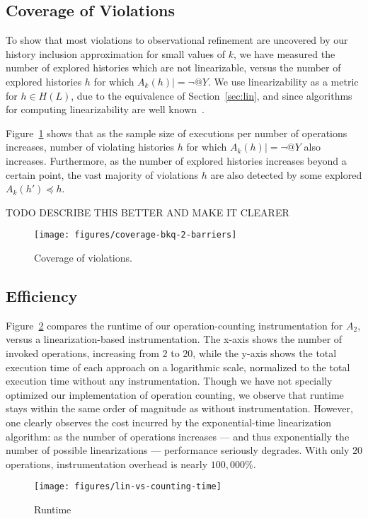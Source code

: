 \subsection{Coverage of Violations}

To show that most violations to observational refinement are uncovered by our
history inclusion approximation for small values of $k$, we have measured the
number of explored histories which are not linearizable, versus the number of
explored histories $h$ for which $A_k(h) |= \lnot @Y$. We use linearizability
as a metric for $h \in H(L)$, due to the equivalence of Section~\ref{sec:lin},
and since algorithms for computing linearizability are well
known~\cite{conf/pldi/BurckhardtDMT10}.

Figure~\ref{fig:data:coverage} shows that as the sample size of executions per
number of operations increases, number of violating histories $h$ for which
$A_k(h) |= \lnot @Y$ also increases. Furthermore, as the number of explored
histories increases beyond a certain point, the vast majority of violations $h$
are also detected by some explored $A_k(h') \preceq h$.

TODO DESCRIBE THIS BETTER AND MAKE IT CLEARER

\begin{figure}
  \centering
  \texttt{[image: figures/coverage-bkq-2-barriers]}
  \caption{Coverage of violations.}
  \label{fig:data:coverage}
\end{figure}

\subsection{Efficiency}

Figure~\ref{fig:data:runtime} compares the runtime of our operation-counting
instrumentation for $A_2$, versus a linearization-based instrumentation. The
x-axis shows the number of invoked operations, increasing from $2$ to $20$,
while the y-axis shows the total execution time of each approach on a
logarithmic scale, normalized to the total execution time without any
instrumentation. Though we have not specially optimized our implementation of
operation counting, we observe that runtime stays within the same order of
magnitude as without instrumentation. However, one clearly observes the cost
incurred by the exponential-time linearization algorithm: as the number of
operations increases --- and thus exponentially the number of possible
linearizations --- performance seriously degrades. With only $20$ operations,
instrumentation overhead is nearly $100,000$\%.


\begin{figure}
  \centering
  \texttt{[image: figures/lin-vs-counting-time]}
  \caption{Runtime}
  \label{fig:data:runtime}
\end{figure}
